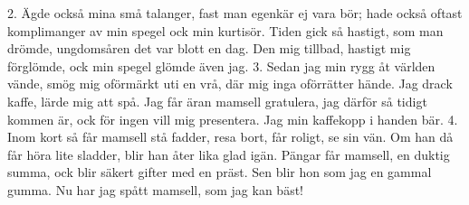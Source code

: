2.  Ägde också mina små talanger,
    fast man egenkär ej vara bör;
    hade också oftast komplimanger
    av min spegel ock min kurtisör.
    Tiden gick så hastigt, som man drömde,
    ungdomsåren det var blott en dag.
    Den mig tillbad, hastigt mig förglömde,
    ock min spegel glömde även jag.
3.  Sedan jag min rygg åt världen vände,
    smög mig oförmärkt uti en vrå,
    där mig inga oförrätter hände.
    Jag drack kaffe, lärde mig att spå.
    Jag får äran mamsell gratulera,
    jag därför så tidigt kommen är,
    ock för ingen vill mig presentera.
    Jag min kaffekopp i handen bär.
4.  Inom kort så får mamsell stå fadder,
    resa bort, får roligt, se sin vän.
    Om han då får höra lite sladder,
    blir han åter lika glad igän.
    Pängar får mamsell, en duktig summa,
    ock blir säkert gifter med en präst.
    Sen blir hon som jag en gammal gumma.
    Nu har jag spått mamsell, som jag kan bäst!
